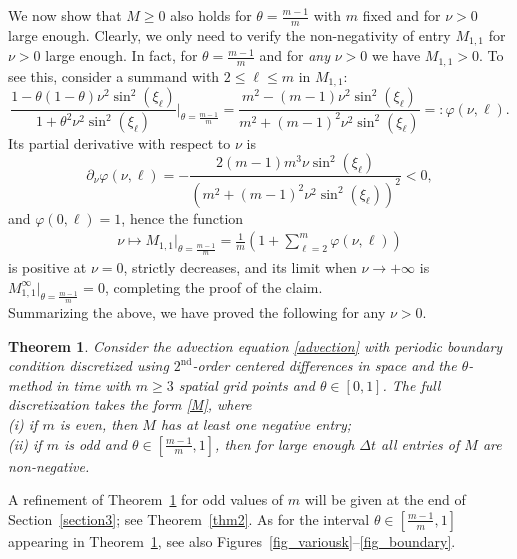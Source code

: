 \documentclass[smallextended,numbook,runningheads]{svjour3}     %
\newtheorem{theorem}{Theorem}
\newtheorem{theorem}{Theorem}
\newcommand{\dt}{\Delta t}
\newcommand{\te}{\theta}
\begin{document}
\begin{description}[style=unboxed,leftmargin=0cm]
We now show that $M\ge 0$ also holds for $\theta=\frac{m-1}{m}$ with $m$ fixed and for $\nu>0$ large enough. 
Clearly, we only need to verify the non-negativity of entry $M_{1,1}$ for $\nu>0$ large enough. 
In fact, for $\theta=\frac{m-1}{m}$ and for \emph{any} $\nu>0$ we have $M_{1,1}> 0$. To see this, consider a summand with $2\le\ell\le m$ in $M_{1,1}$: 
\[
 \frac{1-\theta(1-\theta)\nu^2\sin^2(\xi_\ell)}{1+\theta^2\nu^2\sin^2(\xi_\ell)}\Bigg|_{\theta=\frac{m-1}{m}}=
 \frac{m^2-(m-1) \nu ^2 \sin ^2\left(\xi _\ell\right)}{m^2+(m-1)^2 \nu ^2 \sin ^2\left(\xi _\ell\right)}=:\varphi(\nu,\ell).
\]
Its partial derivative with respect to $\nu$ is
\[
\partial_\nu\varphi(\nu,\ell)=-\frac{2 (m-1) m^3 \nu  \sin ^2\left(\xi _\ell\right)}{\left(m^2+(m-1)^2 \nu ^2 \sin ^2\left(\xi _\ell\right)\right)^2}<0,
\]
and $\varphi(0,\ell)=1$, hence the function
\begin{align*}
	\nu\mapsto M_{1,1}\Big|_{\theta=\frac{m-1}{m}} =
		\frac{1}{m} \left(1 + \sum_{\ell=2}^{m} \varphi(\nu,\ell)\right)
\end{align*}
is positive at $\nu=0$, strictly decreases, and its limit when $\nu\to +\infty$ is
$M_{1,1}^\infty\big|_{\theta=\frac{m-1}{m}}=0$, completing the proof of the claim.\\

Summarizing the above, we have proved the following for any $\nu>0$.
\end{description}
\begin{theorem}\label{thm1}
Consider the advection equation \eqref{advection} with periodic boundary condition discretized using
$2^{\text{nd}}$-order centered differences in space and the $\theta$-method in time with $m\ge 3$ spatial grid
points and $\te\in[0,1]$.
The full discretization takes the form \eqref{M},
where\\
(i) if $m$ is even, then $M$ has at least one negative entry;\\
(ii) if $m$ is odd and $\theta\in\left[\frac{m-1}{m},1\right]$, then for large enough $\dt$ all
entries of $M$ are non-negative.
\end{theorem}



A refinement of Theorem~\ref{thm1} for odd values of $m$ will be given at the end of
Section~\ref{section3}; see Theorem~\ref{thm2}.
As for the interval $\theta\in\left[\frac{m-1}{m},1\right]$ appearing in Theorem~\ref{thm1}, see also
Figures~\ref{fig_variousk}--\ref{fig_boundary}.
\end{document}
